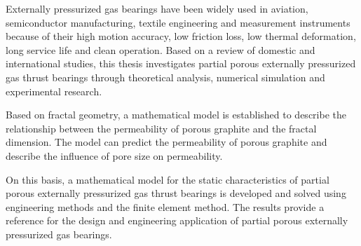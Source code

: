 \begin{eabstract}
Externally pressurized gas bearings have been widely used in aviation, semiconductor manufacturing, textile engineering and measurement instruments because of their high motion accuracy, low friction loss, low thermal deformation, long service life and clean operation. Based on a review of domestic and international studies, this thesis investigates partial porous externally pressurized gas thrust bearings through theoretical analysis, numerical simulation and experimental research.

Based on fractal geometry, a mathematical model is established to describe the relationship between the permeability of porous graphite and the fractal dimension. The model can predict the permeability of porous graphite and describe the influence of pore size on permeability.

On this basis, a mathematical model for the static characteristics of partial porous externally pressurized gas thrust bearings is developed and solved using engineering methods and the finite element method. The results provide a reference for the design and engineering application of partial porous externally pressurized gas bearings.
\end{eabstract}

